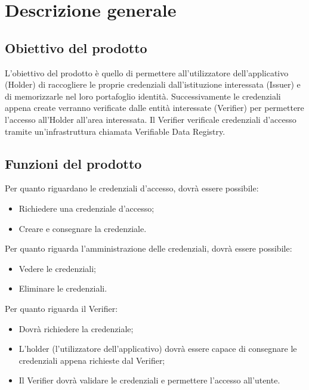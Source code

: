 \section{Descrizione generale}

\subsection{Obiettivo del prodotto}
L’obiettivo del prodotto è quello di permettere all’utilizzatore dell’applicativo (Holder) di raccogliere le proprie credenziali dall’istituzione interessata (Issuer) e di 
memorizzarle nel loro portafoglio identità. Successivamente le credenziali appena create verranno verificate dalle entità interessate (Verifier) per permettere l’accesso 
all'Holder all’area interessata. Il Verifier verifica\glo le credenziali d’accesso tramite un’infrastruttura chiamata Verifiable Data Registry.

\subsection{Funzioni del prodotto}
Per quanto riguardano le credenziali d’accesso, dovrà essere possibile: 
\begin{itemize}
    \item Richiedere una credenziale d’accesso;
    \item Creare e consegnare la credenziale.
\end{itemize}
Per quanto riguarda l’amministrazione delle credenziali, dovrà essere possibile: 
\begin{itemize}
    \item Vedere le credenziali;
    \item Eliminare le credenziali.
\end{itemize}
Per quanto riguarda il Verifier: 
\begin{itemize}
    \item Dovrà richiedere la credenziale;
    \item L'holder (l’utilizzatore dell’applicativo) dovrà essere capace di consegnare le credenziali appena richieste dal Verifier;
    \item Il Verifier dovrà validare le credenziali e permettere l’accesso all’utente.
\end{itemize}


